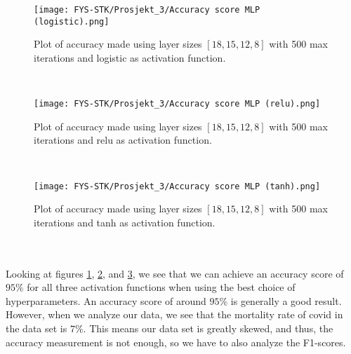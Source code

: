 \documentclass[english,notitlepage,reprint,nofootinbib]{revtex4-1}  %
\begin{document}
\begin{figure}[H]
    \centering
    \texttt{[image: FYS-STK/Prosjekt\_3/Accuracy score MLP (logistic).png]}
    \caption{Plot of accuracy made using layer sizes $[18,15,12,8]$ with 500 max iterations and logistic as activation function.}
    \label{fig: 4}
\end{figure}
\\
\begin{figure}[H]
    \centering
    \texttt{[image: FYS-STK/Prosjekt\_3/Accuracy score MLP (relu).png]}
    \caption{Plot of accuracy made using layer sizes $[18,15,12,8]$ with 500 max iterations and relu as activation function.}
    \label{fig: 5}
\end{figure}
\\
\begin{figure}[H]
    \centering
    \texttt{[image: FYS-STK/Prosjekt\_3/Accuracy score MLP (tanh).png]}
    \caption{Plot of accuracy made using layer sizes $[18,15,12,8]$ with 500 max iterations and tanh as activation function.}
    \label{fig: 6}
\end{figure}
\\
\\
Looking at figures \ref{fig: 4}, \ref{fig: 5}, and \ref{fig: 6}, we see that we can achieve an accuracy score of $95 \%$ for all three activation functions when using the best choice of hyperparameters. An accuracy score of around $95 \%$ is generally a good result. However, when we analyze our data, we see that the mortality rate of covid in the data set is $7 \%$. This means our data set is greatly skewed, and thus, the accuracy measurement is not enough, so we have to also analyze the F1-scores. %
\end{document}
